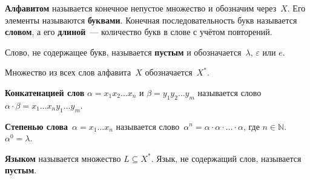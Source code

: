  \textbf{Алфавитом} называется конечное непустое множество и обозначим через~$X$.
 Его элементы называются \textbf{буквами}.
 Конечная последовательность букв называется \textbf{словом}, а его \textbf{длиной}~--- количество букв в слове с учётом повторений.

Слово, не содержащее букв, называется \textbf{пустым} и обозначается~$\lambda$, $\varepsilon$ или $e$.

Множество из всех слов алфавита~$X$ обозначается~$X^*$.

\textbf{Конкатенацией слов} $\alpha = x_1 x_2 \ldots x_n$ и $\beta = y_1 y_2 \ldots y_m$ называется слово $\alpha \cdot \beta = x_1 \ldots x_n y_1 \ldots y_m$.

\textbf{Степенью слова}~$\alpha = x_1 \ldots x_n$ называется слово~$\alpha^n = \alpha \cdot \alpha \cdot \ldots \cdot \alpha$, где $n \in \mathbb N$.
$\alpha^0 = \lambda$.

 \textbf{Языком} называется множество $L \subseteq X^*$.
Язык, не содержащий слов, называется \textbf{пустым}.